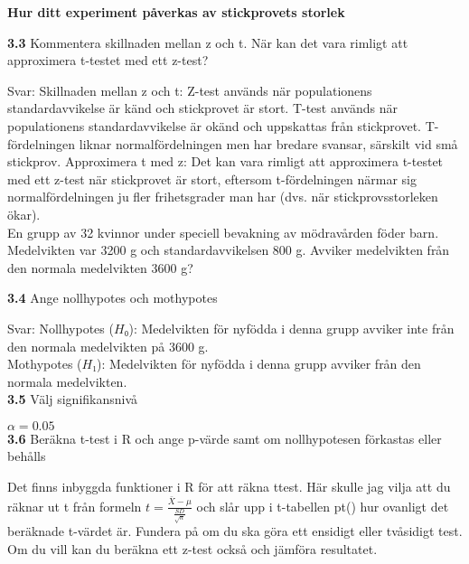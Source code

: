 \documentclass[
  letterpaper,
  DIV=11,
  numbers=noendperiod]{scrartcl}
\begin{document}
\textbf{Hur ditt experiment påverkas av stickprovets storlek}

\textbf{3.3} Kommentera skillnaden mellan z och t. När kan det vara
rimligt att approximera t-testet med ett z-test?

\hfill\break
Svar: Skillnaden mellan z och t: Z-test används när populationens
standardavvikelse är känd och stickprovet är stort. T-test används när
populationens standardavvikelse är okänd och uppskattas från
stickprovet. T-fördelningen liknar normalfördelningen men har bredare
svansar, särskilt vid små stickprov. Approximera t med z: Det kan vara
rimligt att approximera t-testet med ett z-test när stickprovet är
stort, eftersom t-fördelningen närmar sig normalfördelningen ju fler
frihetsgrader man har (dvs. när stickprovsstorleken ökar).\\

En grupp av 32 kvinnor under speciell bevakning av mödravården föder
barn. Medelvikten var 3200 g och standardavvikelsen 800 g. Avviker
medelvikten från den normala medelvikten 3600 g?

\textbf{3.4} Ange nollhypotes och mothypotes

\hfill\break
Svar: Nollhypotes (\(H₀\)): Medelvikten för nyfödda i denna grupp
avviker inte från den normala medelvikten på 3600 g.\\
Mothypotes (\(H₁\)): Medelvikten för nyfödda i denna grupp avviker från
den normala medelvikten.\\

\textbf{3.5} Välj signifikansnivå

\hfill\break
\(\alpha = 0.05\)\\

\textbf{3.6} Beräkna t-test i R och ange p-värde samt om nollhypotesen
förkastas eller behålls

Det finns inbyggda funktioner i R för att räkna ttest. Här skulle jag
vilja att du räknar ut t från formeln
\(t = \frac{\bar{X} - \mu}{\frac{SD}{\sqrt{n}}}\) och slår upp i
t-tabellen pt() hur ovanligt det beräknade t-värdet är. Fundera på om du
ska göra ett ensidigt eller tvåsidigt test. Om du vill kan du beräkna
ett z-test också och jämföra resultatet.
\end{document}
